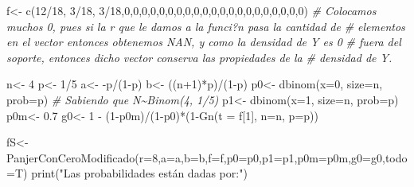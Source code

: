 \documentclass[
]{article}
\newenvironment{Shaded}{\begin{snugshade}}{\end{snugshade}}
\newcommand{\AttributeTok}[1]{\textcolor[rgb]{0.77,0.63,0.00}{#1}}
\newcommand{\CommentTok}[1]{\textcolor[rgb]{0.56,0.35,0.01}{\textit{#1}}}
\newcommand{\DecValTok}[1]{\textcolor[rgb]{0.00,0.00,0.81}{#1}}
\newcommand{\FloatTok}[1]{\textcolor[rgb]{0.00,0.00,0.81}{#1}}
\newcommand{\FunctionTok}[1]{\textcolor[rgb]{0.00,0.00,0.00}{#1}}
\newcommand{\NormalTok}[1]{#1}
\newcommand{\OtherTok}[1]{\textcolor[rgb]{0.56,0.35,0.01}{#1}}
\newcommand{\SpecialCharTok}[1]{\textcolor[rgb]{0.00,0.00,0.00}{#1}}
\newcommand{\StringTok}[1]{\textcolor[rgb]{0.31,0.60,0.02}{#1}}
\begin{document}
\begin{Shaded}
\begin{Highlighting}[]
\NormalTok{f}\OtherTok{\textless{}{-}} \FunctionTok{c}\NormalTok{(}\DecValTok{12}\SpecialCharTok{/}\DecValTok{18}\NormalTok{, }\DecValTok{3}\SpecialCharTok{/}\DecValTok{18}\NormalTok{, }\DecValTok{3}\SpecialCharTok{/}\DecValTok{18}\NormalTok{,}\DecValTok{0}\NormalTok{,}\DecValTok{0}\NormalTok{,}\DecValTok{0}\NormalTok{,}\DecValTok{0}\NormalTok{,}\DecValTok{0}\NormalTok{,}\DecValTok{0}\NormalTok{,}\DecValTok{0}\NormalTok{,}\DecValTok{0}\NormalTok{,}\DecValTok{0}\NormalTok{,}\DecValTok{0}\NormalTok{,}\DecValTok{0}\NormalTok{,}\DecValTok{0}\NormalTok{,}\DecValTok{0}\NormalTok{,}\DecValTok{0}\NormalTok{,}\DecValTok{0}\NormalTok{,}\DecValTok{0}\NormalTok{,}\DecValTok{0}\NormalTok{,}\DecValTok{0}\NormalTok{,}\DecValTok{0}\NormalTok{,}\DecValTok{0}\NormalTok{,}\DecValTok{0}\NormalTok{)}
\CommentTok{\# Colocamos muchos 0, pues si la r que le damos a la funci?n pasa la cantidad de}
\CommentTok{\# elementos en el vector entonces obtenemos NAN, y como la densidad de Y es 0 }
\CommentTok{\# fuera del soporte, entonces dicho vector conserva las propiedades de la }
\CommentTok{\# densidad de Y.}

\NormalTok{n}\OtherTok{\textless{}{-}} \DecValTok{4}
\NormalTok{p}\OtherTok{\textless{}{-}} \DecValTok{1}\SpecialCharTok{/}\DecValTok{5}
\NormalTok{a}\OtherTok{\textless{}{-}} \SpecialCharTok{{-}}\NormalTok{p}\SpecialCharTok{/}\NormalTok{(}\DecValTok{1}\SpecialCharTok{{-}}\NormalTok{p)}
\NormalTok{b}\OtherTok{\textless{}{-}}\NormalTok{ ((n}\SpecialCharTok{+}\DecValTok{1}\NormalTok{)}\SpecialCharTok{*}\NormalTok{p)}\SpecialCharTok{/}\NormalTok{(}\DecValTok{1}\SpecialCharTok{{-}}\NormalTok{p)}
\NormalTok{p0}\OtherTok{\textless{}{-}} \FunctionTok{dbinom}\NormalTok{(}\AttributeTok{x=}\DecValTok{0}\NormalTok{, }\AttributeTok{size=}\NormalTok{n, }\AttributeTok{prob=}\NormalTok{p) }\CommentTok{\# Sabiendo que N\textasciitilde{}Binom(4, 1/5)}
\NormalTok{p1}\OtherTok{\textless{}{-}} \FunctionTok{dbinom}\NormalTok{(}\AttributeTok{x=}\DecValTok{1}\NormalTok{, }\AttributeTok{size=}\NormalTok{n, }\AttributeTok{prob=}\NormalTok{p)}
\NormalTok{p0m}\OtherTok{\textless{}{-}} \FloatTok{0.7}
\NormalTok{g0}\OtherTok{\textless{}{-}} \DecValTok{1} \SpecialCharTok{{-}}\NormalTok{ (}\DecValTok{1}\SpecialCharTok{{-}}\NormalTok{p0m)}\SpecialCharTok{/}\NormalTok{(}\DecValTok{1}\SpecialCharTok{{-}}\NormalTok{p0)}\SpecialCharTok{*}\NormalTok{(}\DecValTok{1}\SpecialCharTok{{-}}\FunctionTok{Gn}\NormalTok{(}\AttributeTok{t =}\NormalTok{ f[}\DecValTok{1}\NormalTok{], }\AttributeTok{n=}\NormalTok{n, }\AttributeTok{p=}\NormalTok{p))}

\NormalTok{fS}\OtherTok{\textless{}{-}}\FunctionTok{PanjerConCeroModificado}\NormalTok{(}\AttributeTok{r=}\DecValTok{8}\NormalTok{,}\AttributeTok{a=}\NormalTok{a,}\AttributeTok{b=}\NormalTok{b,}\AttributeTok{f=}\NormalTok{f,}\AttributeTok{p0=}\NormalTok{p0,}\AttributeTok{p1=}\NormalTok{p1,}\AttributeTok{p0m=}\NormalTok{p0m,}\AttributeTok{g0=}\NormalTok{g0,}\AttributeTok{todo=}\NormalTok{T)}
\FunctionTok{print}\NormalTok{(}\StringTok{"Las probabilidades están dadas por:"}\NormalTok{)}
\end{Highlighting}
\end{Shaded}
\end{document}
